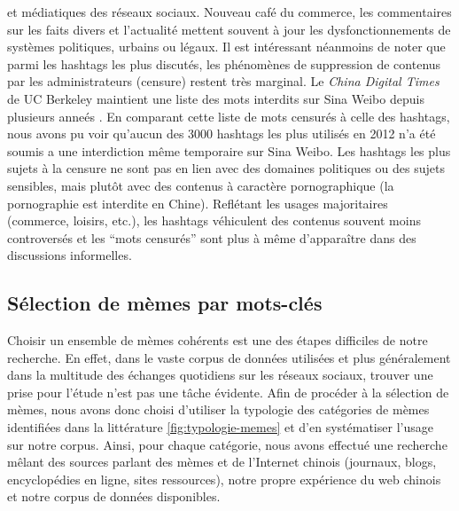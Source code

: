 et médiatiques des réseaux sociaux. Nouveau café du commerce, les commentaires sur les faits divers et l{\textquoteright}actualité mettent souvent à jour les dysfonctionnements de systèmes politiques, urbains ou légaux. Il est intéressant néanmoins de noter que parmi les hashtags les plus discutés, les phénomènes de suppression de contenus par les administrateurs (censure) restent très marginal. Le \textit{China Digital Times} de UC Berkeley maintient une liste des mots interdits sur Sina Weibo depuis plusieurs anneés \citep{Ng2013}. En comparant cette liste de mots censurés à celle des hashtags, nous avons pu voir qu{\textquoteright}aucun des 3000 hashtags les plus utilisés en 2012 n{\textquoteright}a été soumis a une interdiction m\^eme temporaire sur Sina Weibo. Les hashtags les plus sujets à la censure ne sont pas en lien avec des domaines politiques ou des sujets sensibles, mais plut\^ot avec des contenus à caractère pornographique (la pornographie est interdite en Chine). Reflétant les usages majoritaires (commerce, loisirs, etc.), les hashtags véhiculent des contenus souvent moins controversés et les {\textquotedblleft}mots censurés{\textquotedblright} sont plus à m\^eme d{\textquoteright}appara\^itre dans des discussions informelles.


\subsection[Sélection de mèmes par mots-clés]{Sélection de mèmes par mots-clés}
\label{sec:keywords}
Choisir un ensemble de mèmes cohérents est une des étapes difficiles de notre recherche. En effet, dans le vaste corpus de données utilisées et plus généralement dans la multitude des échanges quotidiens sur les réseaux sociaux, trouver une prise pour l{\textquoteright}étude n{\textquoteright}est pas une t\^ache évidente. Afin de procéder à la sélection de mèmes, nous avons donc choisi d{\textquoteright}utiliser la typologie des catégories de mèmes identifiées dans la littérature \ref{fig:typologie-memes} et d{\textquoteright}en systématiser l{\textquoteright}usage sur notre corpus. Ainsi, pour chaque catégorie, nous avons effectué une recherche m\^elant des sources parlant des mèmes et de l{\textquoteright}Internet chinois (journaux, blogs, encyclopédies en ligne, sites ressources), notre propre expérience du web chinois et notre corpus de données disponibles. 

